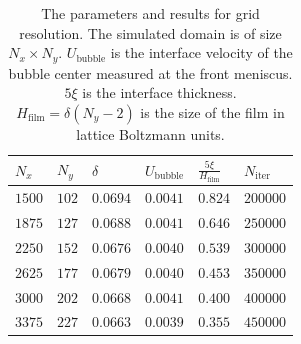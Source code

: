 \documentclass{CFD2011}
\begin{document}
\begin{table}
\begin{tabularx}{0.5\textwidth}{|X|X|X|X|X|X|}
\hline
$N_x$&$N_y$&$\delta$&$U_\mathrm{bubble}$&$\frac{5\xi}{H_{\mathrm{film}}}$&$N_\mathrm{iter}$\\
\hline
$1500$&$102$&$0.0694$&$0.0041$&$0.824$&$200000$\\
\hline
$1875$&$127$&$0.0688$&$0.0041$&$0.646$&$250000$\\
\hline
$2250$&$152$&$0.0676$&$0.0040$&$0.539$&$300000$\\
\hline
$2625$&$177$&$0.0679$&$0.0040$&$0.453$&$350000$\\
\hline
$3000$&$202$&$0.0668$&$0.0041$&$0.400$&$400000$\\
\hline
$3375$&$227$&$0.0663$&$0.0039$&$0.355$&$450000$\\
\hline
\end{tabularx}
\caption{The parameters and results for grid resolution. The simulated domain is
of size $N_x \times N_y$. $U_\mathrm{bubble}$ is the interface velocity of the bubble center
measured at the front meniscus.  $5\xi$ is the interface thickness. $H_{\mathrm{film}}=\delta
(N_y-2)$ is the size of the film in
lattice Boltzmann units.
\label{table:parameters:grid:refinement}}
\end{table}
\end{document}
